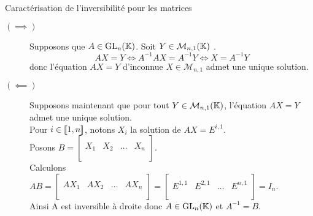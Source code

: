\documentclass{article}
\renewenvironment{question_kholle}[2][ ]
{
	\subsection{\texorpdfstring{#2}{}}
	\notblank{#1}
	{
		\noindent #1
		\bigbreak
	}
	{}
	\begin{proof}
}
{
	\end{proof}
}
\begin{document}
\begin{question_kholle}
	[$A \in \mathcal{M}_n(\K)$ est inversible si et seulement si pour tout $Y \in \mathcal{M}_{n,1}(\K)$, l'équation $AX = Y$ d'inconnue $X \in \mathcal{M}_{n,1}$ admet une unique solution.]
	{Caractérisation de l'inversibilité pour les matrices}
	\hfill\\
	\begin{description}
		\item[$(\implies )$]
		      Supposons que $A \in \mathrm{GL}_n(\mathbb K)$.
		      Soit $Y \in \mathcal{M}_{n,1}(\K)$ \fq. \\
		      \[AX = Y \iff A^{-1}AX = A^{-1}Y \iff X = A^{-1}Y\]
		      donc l'équation $AX = Y$ d'inconnue $X \in \mathcal{M}_{n,1}$ admet une unique solution.

		\item[$(\impliedby)$] Supposons maintenant que pour tout $Y \in \mathcal{M}_{n,1}(\K)$, l’équation $AX = Y$ admet une unique solution.\\
		      Pour $i \in [\![ 1,n ]\!]$, notons  $X_i$ la solution de $AX = E^{i,1}$. \\
		      Posons $\displaystyle B = \left[ \begin{array}{c|c|c|c}
					          &     &        &     \\
					      X_1 & X_2 & \ldots & X_n \\
					          &     &        &     \\
				      \end{array} \right]$. \\
		      Calculons $\displaystyle AB
			      = \left[ \begin{array}{c|c|c|c}
					           &      &        &      \\
					      AX_1 & AX_2 & \ldots & AX_n \\
					           &      &        &      \\
				      \end{array} \right]
			      = \left[ \begin{array}{c|c|c|c}
					              &         &        &         \\
					      E^{1,1} & E^{2,1} & \ldots & E^{n,1} \\
					              &         &        &         \\
				      \end{array} \right]
			      = I_n$. \\
		      Ainsi A est inversible à droite donc $A \in \mathrm{GL}_n(\mathbb K)$ et $A^{-1} = B$.
	\end{description}
\end{question_kholle}
\end{document}
